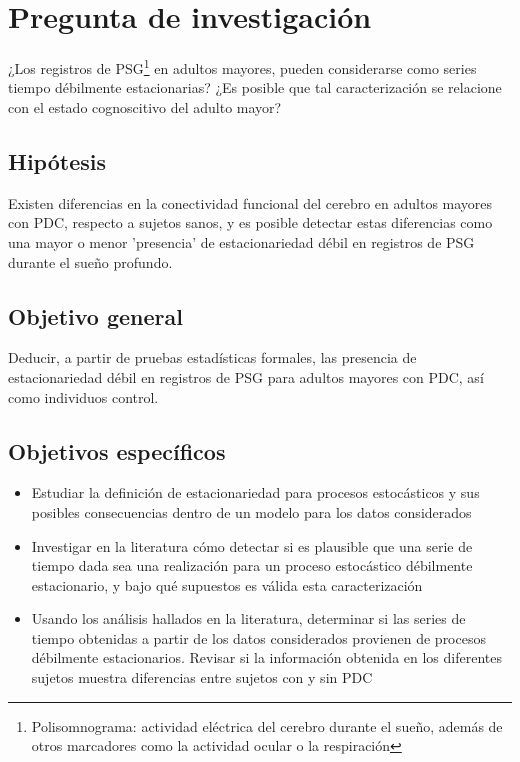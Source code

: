 \section{Pregunta de investigación}

¿Los registros de PSG\footnote{Polisomnograma: actividad eléctrica del cerebro durante el sueño,
además de otros marcadores como la actividad ocular o la respiración} en adultos mayores, pueden
considerarse como series tiempo débilmente estacionarias?
¿Es posible que tal caracterización se relacione con el estado cognoscitivo del adulto mayor?


\subsection{Hipótesis}

Existen diferencias en la conectividad funcional del cerebro en adultos mayores con PDC, respecto
a sujetos sanos, y es posible detectar estas diferencias como una mayor o menor 'presencia' de 
estacionariedad débil en registros de PSG durante el sueño profundo.


\subsection{Objetivo general}

Deducir, a partir de pruebas estadísticas formales, las presencia de estacionariedad débil en
registros de PSG para adultos mayores con PDC, así como individuos control.


\subsection{Objetivos específicos}

\begin{itemize}
\item Estudiar la definición de estacionariedad para procesos estocásticos y sus posibles 
consecuencias dentro de un modelo para los datos considerados

\item Investigar en la literatura cómo detectar si es plausible que una serie de tiempo dada sea 
una realización para un proceso estocástico débilmente estacionario, y bajo qué supuestos 
es válida esta caracterización

\item Usando los análisis hallados en la literatura, determinar si las series de tiempo 
obtenidas a partir de los datos considerados provienen de procesos débilmente estacionarios.
Revisar si la información obtenida en los diferentes sujetos muestra diferencias entre sujetos 
con y sin PDC
\end{itemize}

